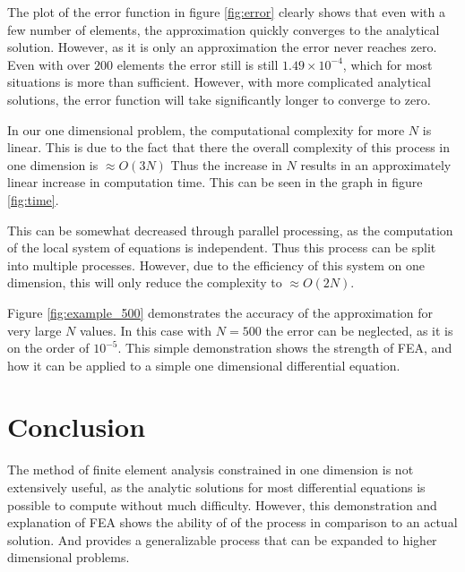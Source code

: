 \documentclass[10pt]{amsart}
\numberwithin{equation}{section}
\newenvironment{Figure}
{\par\medskip\noindent\minipage{\linewidth}}
{\endminipage\par\medskip}
\theoremstyle{definition}
\begin{document}
\begin{multicols}{2}
The plot of the error function in figure \ref{fig:error} clearly shows that
even with a few number of elements, the approximation quickly converges to the
analytical solution. However, as it is only an approximation the error never
reaches zero. Even with over $200$ elements the error still is still
$1.49\times 10^{-4}$, which for most situations is more than sufficient.
However, with more complicated analytical solutions, the error function will
take significantly longer to converge to zero.

In our one dimensional problem, the computational complexity for more $N$ is
linear. This is due to the fact that there the overall complexity of this
process in one dimension is $\approx O(3N)$ Thus the increase in $N$ results in
an approximately linear increase in computation time. This can be seen in the
graph in figure \ref{fig:time}.

\begin{Figure}
   \begin{center}
     
   \end{center}
\end{Figure}

This can be somewhat decreased through parallel processing, as the computation
of the local system of equations is independent. Thus this process can be
split into multiple processes. However, due to the efficiency of this system on
one dimension, this will only reduce the complexity to $\approx O(2N)$.

\begin{Figure}
   \begin{center}
     
   \end{center}
  \label{fig:example_500}
\end{Figure}

Figure \ref{fig:example_500} demonstrates the accuracy of the approximation for
very large $N$ values. In this case with $N=500$ the error can be neglected, as
it is on the order of $10^{-5}$. This simple demonstration shows the strength
of FEA, and how it can be applied to a simple one dimensional differential
equation.

\section{Conclusion}%
\label{sec:conclusion}

The method of finite element analysis constrained in one dimension is not
extensively useful, as the analytic solutions for most differential equations is
possible to compute without much difficulty. However, this demonstration and
explanation of FEA shows the ability of of the process in comparison to an
actual solution. And provides a generalizable process that can be expanded to
higher dimensional problems.

\end{multicols}
\end{document}
